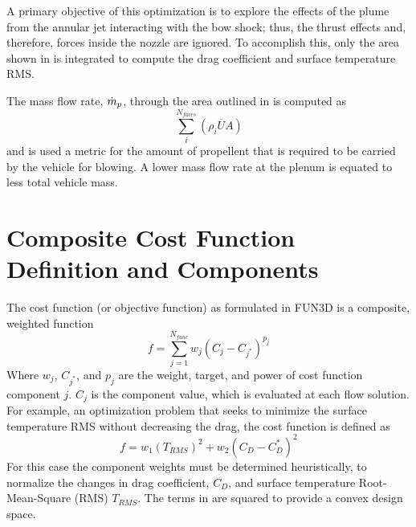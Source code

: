 A primary objective of this optimization is to explore the effects of the plume
from the annular jet interacting with the bow shock; thus, the thrust effects
and, therefore, forces inside the nozzle are ignored.  To accomplish this, only
the area shown in  is integrated to compute the drag
coefficient and surface temperature RMS.

The mass flow rate, $\dot{m}_p$,
through the area outlined in  is computed as
\begin{equation}
  \sum_{i}^{N_{faces}}\left( \rho_i \overline{U} A \right)
  \label{mass-flow-eqn}
\end{equation}
and is used a metric for the amount of propellent that is required to be carried
by the vehicle for blowing.  A lower mass flow rate at the plenum is equated to
less total vehicle mass.

\section{Composite Cost Function Definition and Components}
\label{cost-func-components}

The cost function (or objective function) as formulated in FUN3D is a composite,
weighted function
\begin{equation}
  f = \sum_{j=1}^{N_{func}}w_j\left( C_j - C_{j^*} \right)^{p_j}
  \label{generic-cost-function}
\end{equation}
Where $w_j$, $C_{j^*}$, and $p_j$ are the weight, target, and power of cost
function component $j$.  $C_j$ is the component value, which is evaluated at
each flow solution.  For example, an optimization problem that seeks to minimize the
surface temperature RMS without decreasing the drag, the cost function is
defined as 
\begin{equation}
  f = w_1\left( T_{RMS} \right)^{2} + w_2\left( C_{D} - C_{D}^{*} \right)^2
  \label{cd-tt-cost-function}
\end{equation}
For this case the component weights must be determined heuristically, to normalize
the changes in drag coefficient, $C_D$, and surface temperature Root-Mean-Square
(RMS) $T_{RMS}$.  The terms in  are squared to provide
a convex design space.

